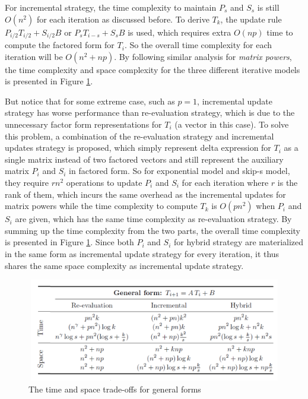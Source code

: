 For incremental strategy, the time complexity to maintain $P_s$ and $S_s$ is still $O(n^2)$ for each iteration as discussed before. To derive $T_k$, the update rule $P_{i/2}T_{i/2} + S_{i/2}B$ or $P_sT_{i-s} + S_sB$ is used, which requires extra $O(np)$ time to compute the factored form for $T_i$. So the overall time complexity for each iteration will be $O(n^2 + np)$. By following similar analysis for {\em matrix powers}, the time complexity and space complexity for the three different iterative models is presented in Figure \ref{fig:time_space_complexity_general_form}.

But notice that for some extreme case, such as $p=1$, incremental update strategy has worse performance than re-evaluation strategy, which is due to the unnecessary factor form representations for $T_i$ (a vector in this case). To solve this problem, a combination of the re-evaluation strategy and incremental updates strategy is proposed, which simply represent delta expression for $T_i$ as a single matrix instead of two factored vectors and still represent the auxiliary matrix $P_i$ and $S_i$ in factored form. So for exponential model and skip-s model, they require $rn^2$ operations to update $P_i$ and $S_i$ for each iteration where $r$ is the rank of them, which incurs the same overhead as the incremental updates for matrix powers while the time complexity to compute $T_k$ is $O(pn^2)$ when $P_i$ and $S_i$ are given, which has the same time complexity as re-evaluation strategy. By summing up the time complexity from the two parts, the overall time complexity is presented in Figure \ref{fig:time_space_complexity_general_form}. Since both $P_i$ and $S_i$ for hybrid strategy are materialized in the same form as incremental update strategy for every iteration, it thus shares the same space complexity as incremental update strategy.


\begin{figure}
    \centering
    \includegraphics[width=12cm, height=4.5cm]{Figures/time_space_complexity_general_form.png}
    \caption{The time and space trade-offs for general forms}
    \label{fig:time_space_complexity_general_form}
\end{figure}


